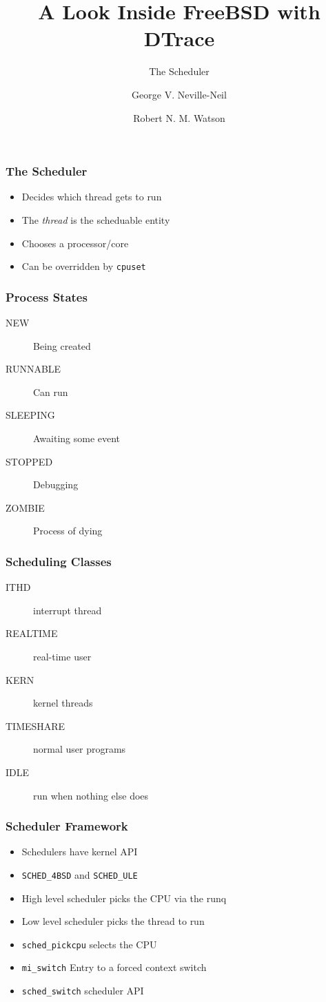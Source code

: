 \documentclass[pdftex]{beamer}
\begin{document}

\title{A Look Inside FreeBSD with DTrace}
\subtitle{The Scheduler}
\author[shortname]{George V. Neville-Neil \and Robert N. M. Watson}

\begin{frame}
  \titlepage
\end{frame}
\begin{frame}[fragile]
  \frametitle{The Scheduler}
  \begin{itemize}
  \item Decides which thread gets to run
  \item The \emph{thread} is the scheduable entity
  \item Chooses a processor/core
  \item Can be overridden by \verb+cpuset+
  \end{itemize}
\end{frame}

\begin{frame}
  \frametitle{Process States}
  \begin{description}
  \item[NEW] Being created
  \item[RUNNABLE] Can run
  \item[SLEEPING] Awaiting some event
  \item[STOPPED] Debugging
  \item[ZOMBIE] Process of dying
  \end{description}
\end{frame}

\begin{frame}
  \frametitle{Scheduling Classes}
  \begin{description}
  \item[ITHD] interrupt thread
  \item[REALTIME] real-time user
  \item[KERN] kernel threads
  \item[TIMESHARE] normal user programs
  \item[IDLE] run when nothing else does
  \end{description}
\end{frame}

\begin{frame}[fragile]
  \frametitle{Scheduler Framework}
  \begin{itemize}
  \item Schedulers have kernel API
  \item \Verb|SCHED_4BSD| and \Verb|SCHED_ULE|
  \item High level scheduler picks the CPU via the runq
  \item Low level scheduler picks the thread to run
  \item \Verb|sched_pickcpu| selects the CPU
  \item \Verb|mi_switch| Entry to a forced context switch
  \item \Verb|sched_switch| scheduler API
  \end{itemize}
\end{frame}
\end{document}
